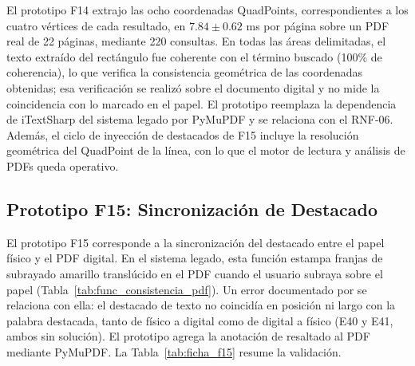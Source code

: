 El prototipo F14 extrajo las ocho coordenadas QuadPoints, correspondientes a los cuatro vértices de cada resultado, en $7.84 \pm 0.62$ ms por página sobre un PDF real de 22 páginas, mediante 220 consultas. En todas las áreas delimitadas, el texto extraído del rectángulo fue coherente con el término buscado (100\% de coherencia), lo que verifica la consistencia geométrica de las coordenadas obtenidas; esa verificación se realizó sobre el documento digital y no mide la coincidencia con lo marcado en el papel. El prototipo reemplaza la dependencia de iTextSharp del sistema legado por PyMuPDF y se relaciona con el RNF-06. Además, el ciclo de inyección de destacados de F15 incluye la resolución geométrica del QuadPoint de la línea, con lo que el motor de lectura y análisis de PDFs queda operativo.
 
\subsection{Prototipo F15: Sincronización de Destacado}
 
El prototipo F15 corresponde a la sincronización del destacado entre el papel físico y el PDF digital. En el sistema legado, esta función estampa franjas de subrayado amarillo translúcido en el PDF cuando el usuario subraya sobre el papel (Tabla~\ref{tab:func_consistencia_pdf}). Un error documentado por \cite{ibaceta2023evaluacion} se relaciona con ella: el destacado de texto no coincidía en posición ni largo con la palabra destacada, tanto de físico a digital como de digital a físico (E40 y E41, ambos sin solución). El prototipo agrega la anotación de resaltado al PDF mediante PyMuPDF. La Tabla~\ref{tab:ficha_f15} resume la validación.
 
